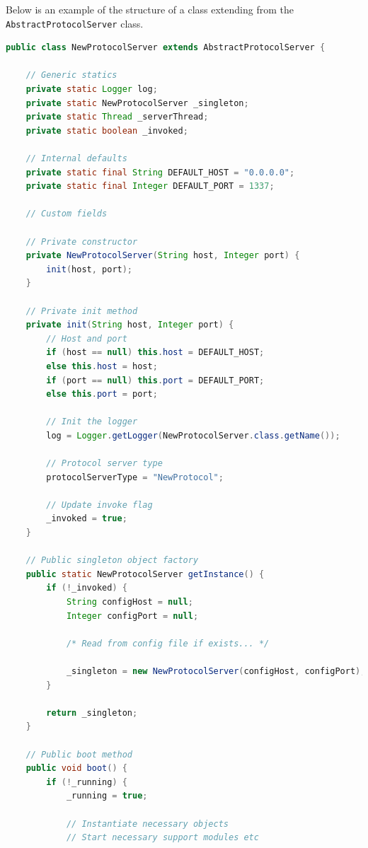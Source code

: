 Below is an example of the structure of a class extending from the \\\verb!AbstractProtocolServer! class.

\begin{lstlisting}[language=Java, captionpos=b, caption=Adding a new protocol, frame=bt, showstringspaces=false]
public class NewProtocolServer extends AbstractProtocolServer {

    // Generic statics
    private static Logger log;
    private static NewProtocolServer _singleton;
    private static Thread _serverThread;
    private static boolean _invoked;
    
    // Internal defaults
    private static final String DEFAULT_HOST = "0.0.0.0";
    private static final Integer DEFAULT_PORT = 1337;
    
    // Custom fields
    
    // Private constructor
    private NewProtocolServer(String host, Integer port) {
        init(host, port);
    }
    
    // Private init method
    private init(String host, Integer port) {
        // Host and port
        if (host == null) this.host = DEFAULT_HOST;
        else this.host = host;
        if (port == null) this.port = DEFAULT_PORT;
        else this.port = port;
        
        // Init the logger
        log = Logger.getLogger(NewProtocolServer.class.getName());
        
        // Protocol server type
        protocolServerType = "NewProtocol";
        
        // Update invoke flag
        _invoked = true;
    }
    
    // Public singleton object factory
    public static NewProtocolServer getInstance() {
        if (!_invoked) {
            String configHost = null;
            Integer configPort = null;
            
            /* Read from config file if exists... */
            
            _singleton = new NewProtocolServer(configHost, configPort);
        }
        
        return _singleton;
    }
    
    // Public boot method
    public void boot() {
        if (!_running) {
            _running = true;
            
            // Instantiate necessary objects
            // Start necessary support modules etc
            

\end{lstlisting}
